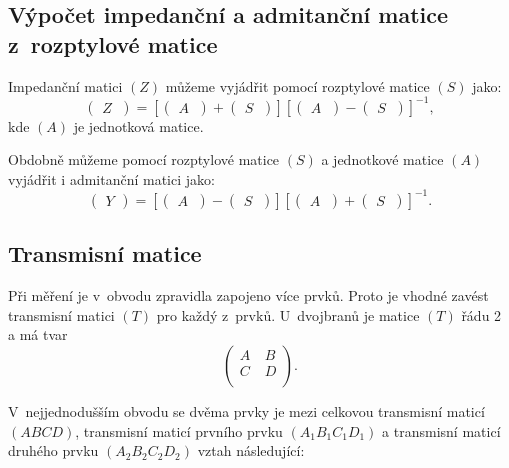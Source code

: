 \documentclass{protokol}
\begin{document}
\subsection{Výpočet impedanční a admitanční matice z~rozptylové matice}

Impedanční matici $(Z)$ můžeme vyjádřit pomocí rozptylové matice $(S)$ jako:
\[
\begin{pmatrix}
	Z~\end{pmatrix}
=
[\begin{pmatrix}
	A~\end{pmatrix}
+
\begin{pmatrix}
	S~\end{pmatrix}]
%
[\begin{pmatrix}
	A~\end{pmatrix}
-
\begin{pmatrix}
	S~\end{pmatrix}]^{-1}
,\]
kde $(A)$ je jednotková matice.
\bigskip

Obdobně můžeme pomocí rozptylové matice $(S)$ a jednotkové matice $(A)$
vyjádřit i admitanční matici jako:
\[
\begin{pmatrix}
	Y
\end{pmatrix}
=
[\begin{pmatrix}
	A~\end{pmatrix}
-
\begin{pmatrix}
	S~\end{pmatrix}]
%
[\begin{pmatrix}
	A~\end{pmatrix}
+
\begin{pmatrix}
	S~\end{pmatrix}]^{-1}
.\]

\subsection{Transmisní matice}
Při měření je v~obvodu zpravidla zapojeno více prvků.
Proto je vhodné zavést transmisní matici $(T)$ pro každý z~prvků.
U~dvojbranů je matice $(T)$ řádu 2 a má tvar
\[
\begin{pmatrix}
	A~& B  \\
	C &	D  \\
\end{pmatrix}
.\]

V~nejjednodušším obvodu se dvěma prvky je mezi celkovou transmisní
maticí $(ABCD)$, transmisní maticí prvního prvku $(A_1B_1C_1D_1)$
a transmisní maticí druhého prvku $(A_2B_2C_2D_2)$ vztah následující:
\end{document}
